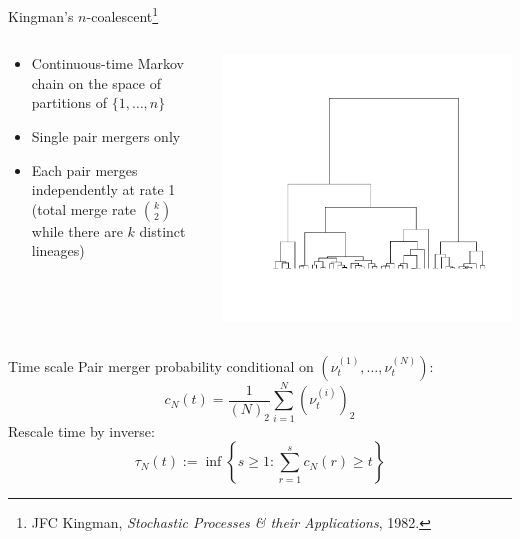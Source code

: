 \documentclass[aspectratio=169]{beamer}
\theoremstyle{definition}
\newcommand{\vt}[2][t]{\nu_{#1}^{(#2)}}
\begin{document}
\begin{frame}{Kingman's $n$-coalescent\footnote[frame]{JFC Kingman, \textit{Stochastic Processes \& their Applications}, 1982.}}
\begin{columns}
\begin{column}{0.45\textwidth}
\begin{itemize}
\item Continuous-time Markov chain on the space of partitions of $\{1,\dots,n\}$
\item Single pair mergers only
\item Each pair merges independently at rate 1 (total merge rate $\binom{k}{2}$ while there are $k$ distinct lineages)
\end{itemize}
\end{column}
\begin{column}{0.45\textwidth}
\includegraphics[width=\textwidth, trim={2.8cm 3cm 1.5cm 2cm}, clip]{ncoalescent.pdf}
\end{column}
\end{columns}
\end{frame}


\begin{frame}{Time scale}
Pair merger probability conditional on $( \vt{1},\dots, \vt{N} )$:
\begin{equation*}
c_N(t) = \frac{1}{(N)_2} \sum_{i=1}^N (\vt{i})_2
\end{equation*}
\pause
Rescale time by inverse:
\begin{equation*}
\tau_N(t) := \inf\left\{ s\geq 1 : \sum_{r=1}^s c_N(r) \geq t \right\}
\end{equation*}
\end{frame}
\end{document}
